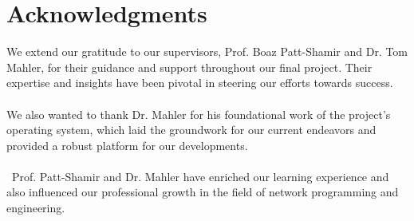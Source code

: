 \chapter*{Acknowledgments}
\large We extend our gratitude to our supervisors, Prof. Boaz Patt-Shamir and Dr. Tom Mahler, for their guidance and support throughout our final project. Their expertise and insights have been pivotal in steering our efforts towards success.\\\\We also wanted to thank Dr. Mahler for his foundational work of the project's operating system, which laid the groundwork for our current endeavors and provided a robust platform for our developments.\\\\\ Prof. Patt-Shamir and Dr. Mahler have enriched our learning experience and also influenced our professional growth in the field of network programming and engineering.